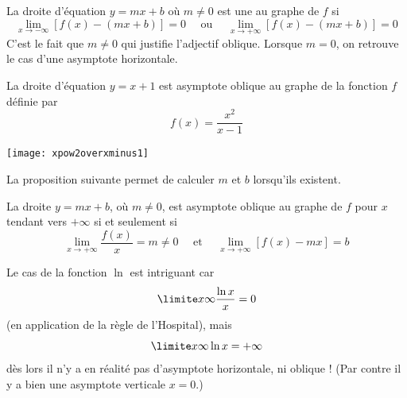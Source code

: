 \begin{frame}
  \begin{definition}
La droite d'équation $y=mx+b$ où $m \neq 0$ est une  au graphe de $f$  si
\begin{equation*}
\lim_{x \to - \infty} \left[ f(x)-(mx+b)\right] =0 \quad \mbox{ ou } \quad
\lim_{x \to + \infty} \left[ f(x) -(mx+b)\right] = 0
\end{equation*}\pause
C'est le fait que $m \neq 0$ qui justifie l'adjectif \og oblique\fg{}.\pause{} Lorsque \(m = 0\), on retrouve le cas d'une asymptote horizontale.
\end{definition}
\end{frame}
\begin{frame}
\begin{example}
  La droite d'équation \(y = x + 1\) est asymptote oblique au graphe de la fonction \(f\) définie par
  \begin{equation*}
    f(x) = \frac{x^{2}}{x-1}
  \end{equation*}
  \begin{center}
    \texttt{[image: xpow2overxminus1]}
  \end{center}
\end{example}
\end{frame}

\begin{frame}
  La proposition suivante permet de calculer \(m\) et \(b\) lorsqu'ils existent.
  \begin{proposition}
    La droite $y=mx+b$, où $m \neq 0$, est asymptote oblique au graphe de $f$ pour $x$ tendant vers $+\infty$ si et seulement si
    \begin{equation*}
      \lim_{x \to + \infty} \frac{f(x)}{x} = m \neq 0 \quad \mbox{ et } \quad
      \lim_{x \to + \infty} \left[ f(x)-mx \right] = b
    \end{equation*}
  \end{proposition}
\end{frame}

\begin{frame}
  \begin{example}
    Le cas de la fonction \(\ln\) est intriguant car
    \begin{equation*}
      \limite x \infty \frac{\ln x}{x} = 0
    \end{equation*}
    (en application de la règle de l'Hospital), mais
    \begin{equation*}
      \limite x \infty \ln x = +\infty
    \end{equation*}
    dès lors il n'y a en réalité pas d'asymptote horizontale, ni oblique !\pause{}
    (Par contre il y a bien une asymptote verticale \(x = 0\).)
  \end{example}
\end{frame}

